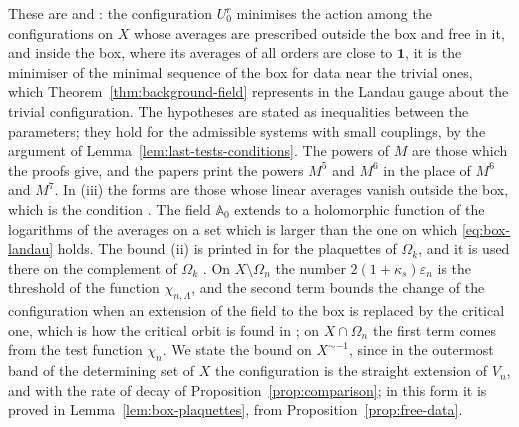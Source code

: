 \documentclass[11pt]{preprint}
\newcommand{\id}{\mathbf 1}
\numberwithin{equation}{section}
\begin{document}
These are \cite[(1.80), (1.83)--(1.87)]{BalabanLFR1} and \cite[(1.3), (1.4), p.~357]{BalabanLFR2}: the configuration $U^r_0$ minimises the action among the configurations on $X$ whose averages are prescribed outside the box and free in it, and inside the box, where its averages of all orders are close to $\id$, it is the minimiser of the minimal sequence of the box for data near the trivial ones, which Theorem~\ref{thm:background-field} represents in the Landau gauge about the trivial configuration. The hypotheses are stated as inequalities between the parameters; they hold for the admissible systems with small couplings, by the argument of Lemma~\ref{lem:last-tests-conditions}. The powers of $M$ are those which the proofs give, and the papers print the powers $M^5$ and $M^6$ in the place of $M^6$ and $M^7$. In (iii) the forms are those whose linear averages vanish outside the box, which is the condition \cite[(1.4)]{BalabanLFR2}. The field $\mathbb A_0$ extends to a holomorphic function of the logarithms of the averages on a set which is larger than the one on which \eqref{eq:box-landau} holds. The bound (ii) is printed in \cite[(1.80)]{BalabanLFR1} for the plaquettes of $\Omega_k$, and it is used there on the complement of $\Omega_k$ \cite[(1.98), p.~200]{BalabanLFR1}. On $X \setminus \Omega_n$ the number $2(1 + \kappa_s)\varepsilon_n$ is the threshold of the function $\chi_{n,\Lambda}$, and the second term bounds the change of the configuration when an extension of the field to the box is replaced by the critical one, which is how the critical orbit is found in \cite[p.~359]{BalabanLFR2}; on $X \cap \Omega_n$ the first term comes from the test function $\chi_n$. We state the bound on $X^{\sim-1}$, since in the outermost band of the determining set of $X$ the configuration is the straight extension of $V_n$, and with the rate of decay of Proposition~\ref{prop:comparison}; in this form it is proved in Lemma~\ref{lem:box-plaquettes}, from Proposition~\ref{prop:free-data}.
\end{document}
